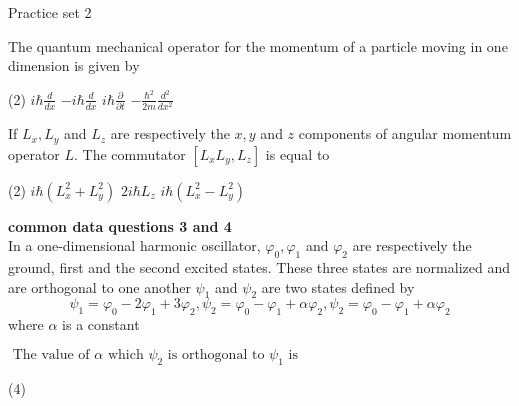 \newpage
\begin{abox}
	Practice set 2
	\end{abox}
\begin{enumerate}
	\begin{minipage}{\textwidth}
		\item The quantum mechanical operator for the momentum of a particle moving in one dimension is given by
	\end{minipage}
	\begin{tasks}(2)
		\task[\textbf{A.}] $i \hbar \frac{d}{d x}$
		\task[\textbf{B.}]$-i \hbar \frac{d}{d x}$
		\task[\textbf{C.}]$i \hbar \frac{\partial}{\partial t}$
		\task[\textbf{D.}]$-\frac{\hbar^{2}}{2 m} \frac{d^{2}}{d x^{2}}$
	\end{tasks}
\begin{minipage}{\textwidth}
	\item If $L_{x}, L_{y}$ and $L_{z}$ are respectively the $x, y$ and $z$ components of angular momentum operator $L$. The commutator $\left[L_{x} L_{y}, L_{z}\right]$ is equal to
\end{minipage}
\begin{tasks}(2)
	\task[\textbf{A.}] $i \hbar\left(L_{x}^{2}+L_{y}^{2}\right)$
	\task[\textbf{B.}]$2 i \hbar L_{z}$
	\task[\textbf{C.}]$i \hbar\left(L_{x}^{2}-L_{y}^{2}\right)$
\end{tasks}
\textbf{common data questions 3 and 4 }\\
In a one-dimensional harmonic oscillator, $\varphi_{0}, \varphi_{1}$ and $\varphi_{2}$ are respectively the ground, first and the second excited states. These three states are normalized and are orthogonal to one another $\psi_{1}$ and $\psi_{2}$ are two states defined by
$$
\psi_{1}=\varphi_{0}-2 \varphi_{1}+3 \varphi_{2}, \psi_{2}=\varphi_{0}-\varphi_{1}+\alpha \varphi_{2}, \psi_{2}=\varphi_{0}-\varphi_{1}+\alpha \varphi_{2}
$$
where $\alpha$ is a constant\\
\begin{minipage}{\textwidth}
	\item $\text { The value of } \alpha \text { which } \psi_{2} \text { is orthogonal to } \psi_{1} \text { is }$
\end{minipage}
\begin{tasks}(4)
\end{tasks}
\begin{minipage}{\textwidth}

\end{minipage}
\end{enumerate}
